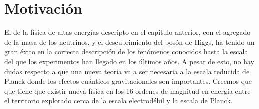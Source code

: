 

\section{Motivación}

El {\SM} de la física de altas energías descripto en el capítulo anterior,
con el agregado de la masa de los neutrinos, y el descubrimiento del bosón
de Higgs, ha tenido un gran éxito en la correcta descripción de los fenómenos
conocidos hasta la escala del {\tev} que los experimentos han llegado en
los últimos a\~nos.
A pesar de esto, no hay dudas respecto a que una nueva teor\'ia va a ser
necesaria a la escala reducida de Planck %
donde los efectos cu\'anticos gravitacionales son importantes. Creemos que
que tiene que existir nueva f\'isica en los 16 ordenes de magnitud en
energ\'ia entre el territorio explorado cerca de la escala electrod\'ebil y
la escala de Planck.

